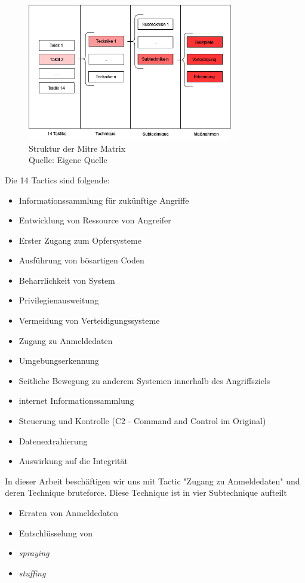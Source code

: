 \begin{figure}[H]
   \centering
   \includegraphics[width=0.8\textwidth]{assets/Mitre_structure.drawio.png}
   \caption{Struktur der Mitre Matrix \\Quelle: Eigene Quelle}
   \centering
\end{figure}

\newpage
Die 14 Tactics sind folgende:
\begin{itemize}[noitemsep]
   \item Informationssammlung für zukünftige Angriffe 
   \item	Entwicklung von Ressource von Angreifer
   \item Erster Zugang zum Opfersysteme 
   \item Ausführung von bösartigen Coden
   \item Beharrlichkeit von System
   \item	Privilegienausweitung
   \item Vermeidung von Verteidigungssysteme
   \item Zugang zu Anmeldedaten
   \item Umgebungserkennung
   \item Seitliche Bewegung zu anderem Systemen innerhalb des Angriffsziels
   \item internet Informationssammlung
   \item Steuerung und Kontrolle (C2 - Command and Control im Original)
   \item Datenextrahierung 
   \item	Auswirkung auf die Integrität
\end{itemize}

In dieser Arbeit beschäftigen wir uns mit Tactic "Zugang zu Anmeldedaten" und deren Technique \gls{bruteforce}. Diese Technique ist in vier Subtechnique aufteilt
\begin{itemize}[noitemsep]
   \item Erraten von Anmeldedaten 
   \item	Entschlüsselung von 
   \item \textit{\gls{spraying}}
   \item \textit{\gls{stuffing}}
\end{itemize}

